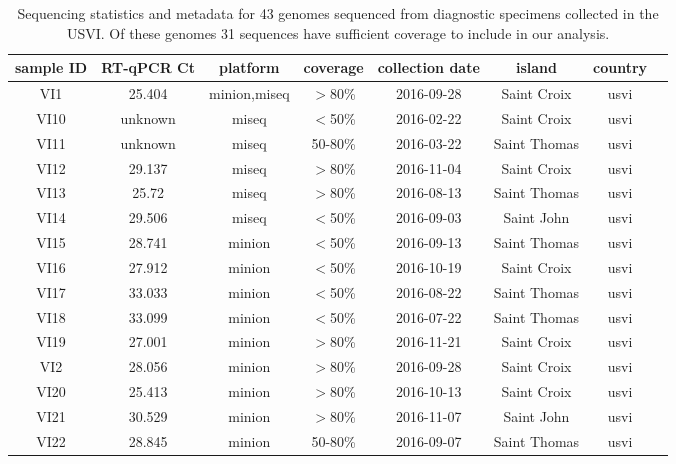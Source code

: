 \documentclass[11pt,oneside,letterpaper]{article}
\begin{document}
\begin{table}
\caption{Sequencing statistics and metadata for 43 genomes sequenced from diagnostic specimens collected in the USVI. Of these genomes 31 sequences have sufficient coverage to include in our analysis.}
\begin{center}
\begin{tabular}{|c|c|c|c|c|c|c|c|}
\toprule
sample ID &   RT-qPCR Ct &  platform & coverage & collection date &      island & country \\
\midrule
    VI1 &   25.404 &  minion,miseq &            $>$80\% &      2016-09-28 &   Saint Croix &    usvi \\
   VI10 &  unknown &         miseq &            $<$50\% &      2016-02-22 &   Saint Croix &    usvi \\
   VI11 &  unknown &         miseq &          50-80\% &      2016-03-22 &  Saint Thomas &    usvi \\
   VI12 &   29.137 &         miseq &            $>$80\% &      2016-11-04 &   Saint Croix &    usvi \\
   VI13 &    25.72 &         miseq &            $>$80\% &      2016-08-13 &  Saint Thomas &    usvi \\
   VI14 &   29.506 &         miseq &            $<$50\% &      2016-09-03 &    Saint John &    usvi \\
   VI15 &   28.741 &        minion &            $<$50\% &      2016-09-13 &  Saint Thomas &    usvi \\
   VI16 &   27.912 &        minion &            $<$50\% &      2016-10-19 &   Saint Croix &    usvi \\
   VI17 &   33.033 &        minion &            $<$50\% &      2016-08-22 &  Saint Thomas &    usvi \\
   VI18 &   33.099 &        minion &            $<$50\% &      2016-07-22 &  Saint Thomas &    usvi \\
   VI19 &   27.001 &        minion &            $>$80\% &      2016-11-21 &   Saint Croix &    usvi \\
    VI2 &   28.056 &        minion &            $>$80\% &      2016-09-28 &   Saint Croix &    usvi \\
   VI20 &   25.413 &        minion &            $>$80\% &      2016-10-13 &   Saint Croix &    usvi \\
   VI21 &   30.529 &        minion &            $>$80\% &      2016-11-07 &    Saint John &    usvi \\
   VI22 &   28.845 &        minion &          50-80\% &      2016-09-07 &  Saint Thomas &    usvi \\

\end{tabular}
\end{center}
\end{table}
\end{document}

